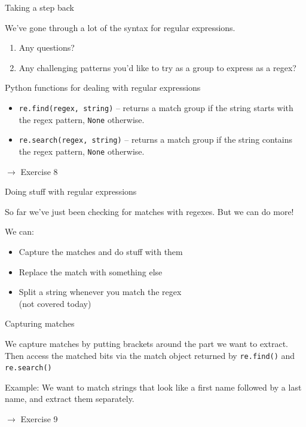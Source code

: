 \documentclass{beamer}
\begin{document}
\begin{frame}{Taking a step back}

We've gone through a lot of the syntax for regular expressions.

\begin{enumerate}
  \item Any questions?
  \item Any challenging patterns you'd like to try as a group to express as a regex?
\end{enumerate}
\end{frame}

\begin{frame}{Python functions for dealing with regular expressions}

\begin{itemize}
  \item \lstinline$re.find(regex, string)$ -- returns a match group if the string starts with the regex pattern, \lstinline$None$ otherwise.
  \item \lstinline$re.search(regex, string)$ -- returns a match group if the string contains the regex pattern, \lstinline$None$ otherwise.
\end{itemize}

\bigskip
$\rightarrow$ Exercise 8

\end{frame}

\begin{frame}{Doing stuff with regular expressions}

So far we've just been checking for matches with regexes. But we can do more!

\bigskip

We can:
\begin{itemize}
 \item Capture the matches and do stuff with them
 \item Replace the match with something else
 \item Split a string whenever you match the regex \\ (not covered today)
\end{itemize}

\end{frame}

\begin{frame}{Capturing matches}

We capture matches by putting brackets around the part we want to extract.
Then access the matched bits via the match object returned by \lstinline$re.find()$ and \lstinline$re.search()$

\bigskip

Example: We want to match strings that look like a first name followed by a last name,
and extract them separately.



$\rightarrow$ Exercise 9

\end{frame}
\end{document}
